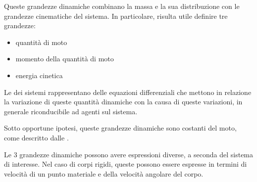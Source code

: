 \documentclass[letterpaper,10pt,italian]{jupyterBook}
\begin{document}
\sphinxAtStartPar
Queste grandezze dinamiche combinano la massa e la sua distribuzione con le grandezze cinematiche del sistema. In particolare, risulta utile definire tre grandezze:
\begin{itemize}
\item {} 
\sphinxAtStartPar
quantità di moto

\item {} 
\sphinxAtStartPar
momento della quantità di moto

\item {} 
\sphinxAtStartPar
energia cinetica

\end{itemize}

\sphinxAtStartPar
Le {\hyperref[\detokenize{ch/mechanics/dynamics-eom:physics-hs-mechanics-dynamics-eom}]{}} dei sistemi rappresentano delle equazioni differenziali che mettono in relazione la variazione di queste quantità dinamiche con la causa di queste variazioni, in generale riconducibile ad {\hyperref[\detokenize{ch/mechanics/actions:physics-hs-mechanics-actions}]{}} agenti sul sistema.

\sphinxAtStartPar
Sotto opportune ipotesi, queste grandezze dinamiche sono costanti del moto, come descritto dalle {\hyperref[\detokenize{ch/mechanics/dynamics-conservation:physics-hs-mechanics-dynamics-conservation}]{}}.

\sphinxAtStartPar
Le 3 grandezze dinamiche possono avere espressioni diverse, a seconda del sistema di interesse. Nel caso di corpi rigidi, queste possono essere espresse in termini di velocità di un punto materiale e della velocità angolare del corpo.

\sphinxstepscope
\end{document}
